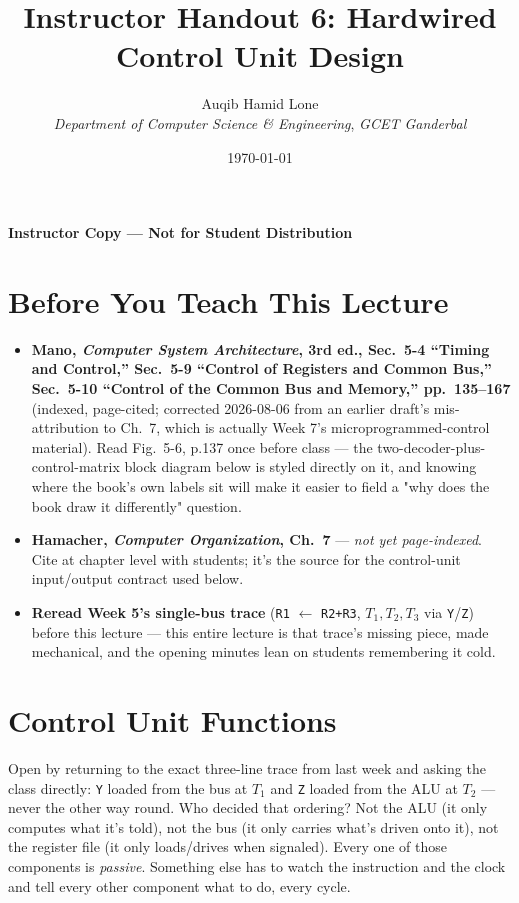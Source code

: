 \documentclass[11pt]{article}
\title{Instructor Handout 6: Hardwired Control Unit Design}
\author{Auqib Hamid Lone\\[0.3em]
  \emph{Department of Computer Science \& Engineering}, \emph{GCET Ganderbal}}
\date{\today}
\begin{document}
\maketitle
{\centering\large\color{negative}\textbf{Instructor Copy --- Not for Student Distribution}\par}
\vspace{0.5cm}

\section{Before You Teach This Lecture}

\begin{itemize}
  \item \textbf{Mano, \textit{Computer System Architecture}, 3rd ed., Sec.~5-4 ``Timing and Control,'' Sec.~5-9 ``Control of Registers and Common Bus,'' Sec.~5-10 ``Control of the Common Bus and Memory,'' pp.~135--167} (indexed, page-cited; corrected 2026-08-06 from an earlier draft's mis-attribution to Ch.~7, which is actually Week 7's microprogrammed-control material). Read Fig.~5-6, p.137 once before class --- the two-decoder-plus-control-matrix block diagram below is styled directly on it, and knowing where the book's own labels sit will make it easier to field a "why does the book draw it differently" question.
  \item \textbf{Hamacher, \textit{Computer Organization}, Ch.~7} --- \emph{not yet page-indexed}. Cite at chapter level with students; it's the source for the control-unit input/output contract used below.
  \item \textbf{Reread Week 5's single-bus trace} (\texttt{R1} $\gets$ \texttt{R2+R3}, $T_1,T_2,T_3$ via \texttt{Y}/\texttt{Z}) before this lecture --- this entire lecture is that trace's missing piece, made mechanical, and the opening minutes lean on students remembering it cold.
\end{itemize}

\section{Control Unit Functions}

Open by returning to the exact three-line trace from last week and asking the class directly: \texttt{Y} loaded from the bus at $T_1$ and \texttt{Z} loaded from the ALU at $T_2$ --- never the other way round. Who decided that ordering? Not the ALU (it only computes what it's told), not the bus (it only carries what's driven onto it), not the register file (it only loads/drives when signaled). Every one of those components is \emph{passive}. Something else has to watch the instruction and the clock and tell every other component what to do, every cycle.
\end{document}
